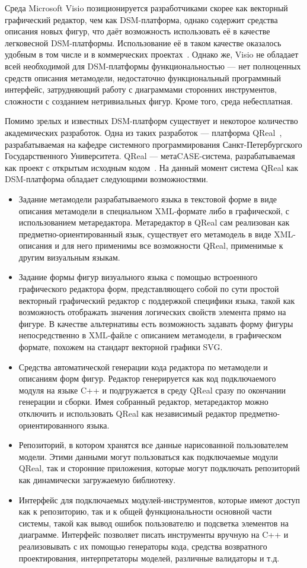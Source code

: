 \documentclass[a4paper]{article}
\begin{document}
Среда Microsoft Visio позиционируется разработчиками скорее как векторный графический редактор, чем как DSM-платформа, однако содержит средства описания новых фигур, что даёт возможность использовать её в качестве легковесной DSM-платформы. Использование её в таком качестве оказалось удобным в том числе и в коммерческих проектах~\cite{videoDsl}. Однако же, Visio не обладает всей необходимой для DSM-платформы функциональностью --- нет полноценных средств описания метамодели, недостаточно функциональный программный интерфейс, затрудняющий работу с диаграммами сторонних инструментов, сложности с созданием нетривиальных фигур. Кроме того, среда небесплатная.

Помимо зрелых и известных DSM-платформ существует и некоторое количество академических разработок. Одна из таких разработок --- платформа QReal~\cite{qReal}, разрабатываемая на кафедре системного программирования Санкт-Петербургского Государственного Университета. QReal --- метаCASE-система, разрабатываемая как проект с открытым исходным кодом~\cite{qRealGithub}. На данный момент система QReal как DSM-платформа обладает следующими возможностями.
\begin{itemize}
  \item Задание метамодели разрабатываемого языка в текстовой форме в виде описания метамодели в специальном XML-формате либо в графической, с использованием метаредактора. Метаредактор в QReal сам реализован как предметно-ориентированный язык, существует его метамодель в виде XML-описания и для него применимы все возможности QReal, применимые к другим визуальным языкам.
  \item Задание формы фигур визуального языка с помощью встроенного графического редактора форм, представляющего собой по сути простой векторный графический редактор с поддержкой специфики языка, такой как возможность отображать значения логических свойств элемента прямо на фигуре. В качестве альтернативы есть возможность задавать форму фигуры непосредственно в XML-файле с описанием метамодели, в графическом формате, похожем на стандарт векторной графики SVG.
  \item Средства автоматической генерации кода редактора по метамодели и описаниям форм фигур. Редактор генерируется как код подключаемого модуля на языке C++ и подгружается в среду QReal сразу по окончании генерации и сборки. Имея собранный редактор, метаредактор можно отключить и использовать QReal как независимый редактор предметно-ориентированного языка.
  \item Репозиторий, в котором хранятся все данные нарисованной пользователем модели. Этими данными могут пользоваться как подключаемые модули QReal, так и сторонние приложения, которые могут подключать репозиторий как динамически загружаемую библиотеку.
  \item Интерфейс для подключаемых модулей-инструментов, которые имеют доступ как к репозиторию, так и к общей функциональности основной части системы, такой как вывод ошибок пользователю и подсветка элементов на диаграмме. Интерфейс позволяет писать инструменты вручную на C++ и реализовывать с их помощью генераторы кода, средства возвратного проектирования, интерпретаторы моделей, различные валидаторы и т.д.
\end{itemize}
\end{document}

